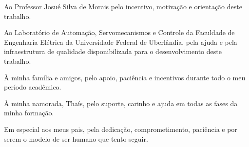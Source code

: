 Ao Professor Josué Silva de Morais pelo incentivo, motivação e
orientação deste trabalho.

Ao Laboratório de Automação, Servomecanismos e Controle da Faculdade
de Engenharia Elétrica da Universidade Federal de Uberlândia, pela
ajuda e pela infraestrutura de qualidade disponibilizada para o
desenvolvimento deste trabalho.

À minha família e amigos, pelo apoio, paciência e incentivos durante
todo o meu período acadêmico.

À minha namorada, Thaís, pelo suporte, carinho e ajuda em todas as
fases da minha formação.

Em especial aos meus pais, pela dedicação, comprometimento, paciência
e por serem o modelo de ser humano que tento seguir.
